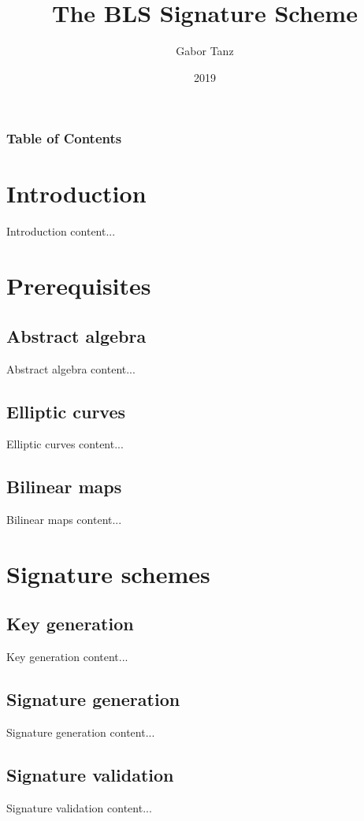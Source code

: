 \documentclass{beamer}
\title[The BLS Signature Scheme]{The BLS Signature Scheme}
\author[Gabor Tanz]{Gabor Tanz}
\institute[BFH]{Berne University of Applied Sciences}
\date[2019]{2019}
\begin{document}
\frame\titlepage

\begin{frame}
	\frametitle{Table of Contents}
	\tableofcontents
\end{frame}

\section{Introduction}
\begin{frame}{Introduction}
	content...
\end{frame}
\section{Prerequisites}
\subsection{Abstract algebra}
\begin{frame}{Abstract algebra}
	content...
\end{frame}
\subsection{Elliptic curves}
\begin{frame}{Elliptic curves}
	content...
\end{frame}
\subsection{Bilinear maps}
\begin{frame}{Bilinear maps}
	content...
\end{frame}
\section{Signature schemes}
\subsection{Key generation}
\begin{frame}{Key generation}
	content...
\end{frame}
\subsection{Signature generation}
\begin{frame}{Signature generation}
	content...
\end{frame}
\subsection{Signature validation}
\begin{frame}{Signature validation}
	content...
\end{frame}
\end{document}
